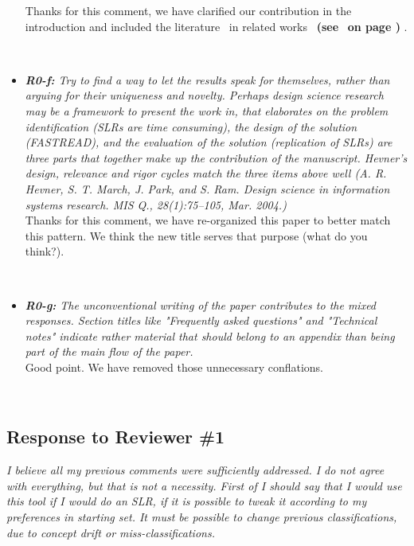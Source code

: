 \documentclass{svjour3}
\theoremstyle{break}
\newcommand{\review}[1]{{\textit{#1}}~\\}
\newcommand{\citeresp}[1]{
{\bf (see } \fcolorbox{black}{black!15}{
 \bf
  \scriptsize R-{#1}}~{\bf{on page \pageref{response:#1})}}
}
\begin{document}
\begin{itemize}
Thanks for this comment, we have clarified our contribution in the introduction and included the literature~\cite{ros2017machine} in related works~\citeresp{0e}.
\par~
\item
\review{\textbf{R0-f:} Try to find a way to let the results speak for themselves, rather than arguing for their uniqueness and novelty. Perhaps design science research may be a framework to present the work in, that elaborates on the problem identification (SLRs are time consuming), the design of the solution (FASTREAD), and the evaluation of the solution (replication of SLRs) are three parts that together make up the contribution of the manuscript. Hevner’s design, relevance and rigor cycles match the three items above well (A. R. Hevner, S. T. March, J. Park, and S. Ram. Design science in information systems research. MIS Q., 28(1):75–105, Mar. 2004.)}

Thanks for this comment, we have re-organized this paper to better match this pattern. We think the new title serves that purpose (what do you think?).
\par~
\item
\review{\textbf{R0-g:}  The unconventional writing of the paper contributes to the mixed responses. Section titles like "Frequently asked questions" and "Technical notes" indicate rather material that should belong to an appendix than being part of the main flow of the paper.}

Good point. We have removed those unnecessary conflations.
\par~

\end{itemize}








 



\subsection*{Response to Reviewer \#1}

\review{ I believe all my previous comments were sufficiently addressed. I do not agree with everything, but that is not a necessity. First of I should say that I would use this tool if I would do an SLR, if it is possible to tweak it according to my preferences in starting set. It must be possible to change previous classifications, due to concept drift or miss-classifications.}
\end{document}
